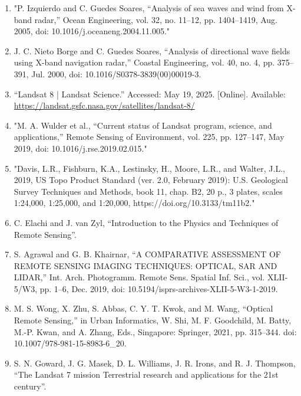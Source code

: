 \documentclass{article}
\begin{document}
\begin{sloppypar}
\begin{enumerate}
    \item{"P. Izquierdo and C. Guedes Soares, “Analysis of sea waves and wind from X-band radar,” Ocean Engineering, vol. 32, no. 11–12, pp. 1404–1419, Aug. 2005, doi: 10.1016/j.oceaneng.2004.11.005."}

    \item{J. C. Nieto Borge and C. Guedes Soares, “Analysis of directional wave fields using X-band navigation radar,” Coastal Engineering, vol. 40, no. 4, pp. 375–391, Jul. 2000, doi: 10.1016/S0378-3839(00)00019-3.}

    \item{“Landsat 8 | Landsat Science.” Accessed: May 19, 2025. [Online]. Available: \url{https://landsat.gsfc.nasa.gov/satellites/landsat-8/}}

    \item{"M. A. Wulder et al., “Current status of Landsat program, science, and applications,” Remote Sensing of Environment, vol. 225, pp. 127–147, May 2019, doi: 10.1016/j.rse.2019.02.015."}

    \item{"Davis, L.R., Fishburn, K.A., Lestinsky, H., Moore, L.R., and Walter, J.L., 2019, US Topo Product Standard (ver. 2.0, February 2019): U.S. Geological Survey Techniques and Methods, book 11, chap. B2, 20 p., 3 plates, scales 1:24,000, 1:25,000, and 1:20,000, https://doi.org/10.3133/tm11b2."}

    \item{C. Elachi and J. van Zyl, “Introduction to the Physics and Techniques of Remote Sensing”.}

    \item{S. Agrawal and G. B. Khairnar, “A COMPARATIVE ASSESSMENT OF REMOTE SENSING IMAGING TECHNIQUES: OPTICAL, SAR AND LIDAR,” Int. Arch. Photogramm. Remote Sens. Spatial Inf. Sci., vol. XLII-5/W3, pp. 1–6, Dec. 2019, doi: 10.5194/isprs-archives-XLII-5-W3-1-2019.}

    \item{M. S. Wong, X. Zhu, S. Abbas, C. Y. T. Kwok, and M. Wang, “Optical Remote Sensing,” in Urban Informatics, W. Shi, M. F. Goodchild, M. Batty, M.-P. Kwan, and A. Zhang, Eds., Singapore: Springer, 2021, pp. 315–344. doi: 10.1007/978-981-15-8983-6_20.}

    \item{S. N. Goward, J. G. Masek, D. L. Williams, J. R. Irons, and R. J. Thompson, “The Landsat 7 mission Terrestrial research and applications for the 21st century”.}
    

\end{enumerate}
\end{sloppypar}
\end{document}
